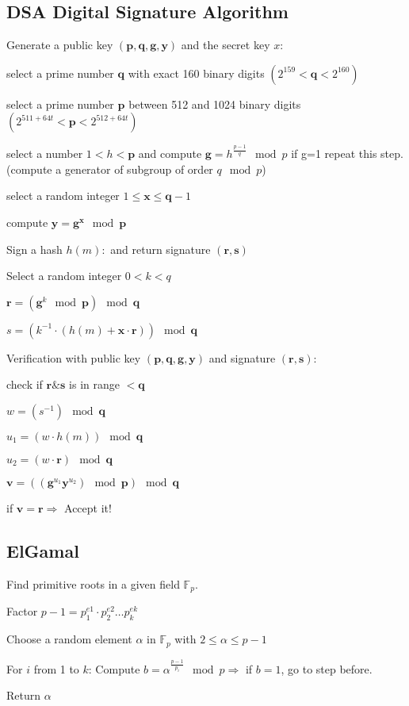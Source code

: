 \subsection{DSA Digital Signature Algorithm}

Generate a public key $(\bm {p,q,g,y})$ and the secret key $x:$
\begin{aufzaehlung}
\item select a prime number $\bm q$ with exact 160 binary digits $(2^{159}< \bm q < 2^{160})$
\item select a prime number $\bm p$ between 512 and 1024 binary digits $(2^{511+64t}< \bm p < 2^{512+64t})$
\item select a number $1< h<\bm p$ and compute $\bm g = h^{\frac{p-1}{q}} \mod p$ if g=1 repeat this step.
(compute a generator of subgroup of order $q \mod p$)
\item select a random integer $1 \leq \bm x \leq \bm q-1$
\item compute $\bm y=\bm g^{\bm x} \mod \bm p$
\end{aufzaehlung}
Sign a hash $h(m):$ and return signature $(\bm {r,s})$
\begin{aufzaehlung}
\item Select a random integer $0< k<q$
\item $\bm r = (\bm g^k \mod \bm p) \mod \bm q$
\item $s=(k^{-1} \cdot (h(m) + \bm x\cdot \bm r))\mod \bm q$
\end{aufzaehlung}
Verification with public key $(\bm {p,q,g,y})$ and signature $(\bm {r,s})$:
\begin{aufzaehlung}
\item check if $\bm r \& \bm s$ is in range $<\bm q$
\item $w=(s^{-1})\mod\bm q$
\item $u_1=( w\cdot h(m)) \mod \bm q$
\item $u_2=( w \cdot \bm r) \mod\bm q$
\item $\bm v=((\bm g^{u_1}\bm y^{u_2})\mod \bm  p) \mod \bm q$
\item if $\bm v= \bm r \Rightarrow$ Accept it!
\end{aufzaehlung}



\subsection{ElGamal}
Find primitive roots in a given field $\mathbb{F}_p$.
\begin{aufzaehlung}
\item Factor $p-1=p_1^{e1} \cdot p_2^{e2} \ldots p_k^{ek}$
\item Choose a random element $\alpha$ in $\mathbb{F}_p$ with $2 \leq \alpha \leq p-1$
\item For $i$ from 1 to $k$:
Compute $b=\alpha ^{\frac{p-1}{p_i}} \mod p \Rightarrow$ if $b=1$, go to step before.
\item Return $\alpha$
\end{aufzaehlung}

